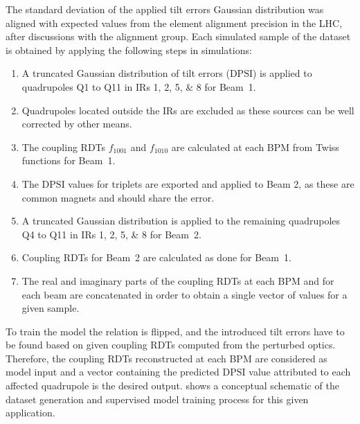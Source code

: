 The standard deviation of the applied tilt errors Gaussian distribution was aligned with expected values from the element alignment precision in the LHC, after discussions with the alignment group.
Each simulated sample of the dataset is obtained by applying the following steps in simulations:
\begin{enumerate}
    \item A truncated Gaussian distribution of tilt errors (\(\mathrm{DPSI}\)) is applied to quadrupoles Q\num{1} to Q\num{11} in IRs \numlist{1;2;5;8} for Beam~\num{1}.
    \item Quadrupoles located outside the IRs are excluded as these sources can be well corrected by other means.
    \item The coupling RDTs \(f_{1001}\) and \(f_{1010}\) are calculated at each BPM from Twiss functions for Beam~\num{1}.
    \item The \(\mathrm{DPSI}\) values for triplets are exported and applied to Beam 2, as these are common magnets and should share the error.
    \item A truncated Gaussian distribution is applied to the remaining quadrupoles Q\num{4} to Q\num{11} in IRs \numlist{1;2;5;8} for Beam~\num{2}.
    \item Coupling RDTs for Beam~\num{2} are calculated as done for Beam~\num{1}.
    \item The real and imaginary parts of the coupling RDTs at each BPM and for each beam are concatenated in order to obtain a single vector of values for a given sample.
\end{enumerate}

To train the model the relation is flipped, and the introduced tilt errors have to be found based on given coupling RDTs computed from the perturbed optics.
Therefore, the coupling RDTs reconstructed at each BPM are considered as model input and a vector containing the predicted \(\mathrm{DPSI}\) value attributed to each affected quadrupole is the desired output.
 shows a conceptual schematic of the dataset generation and supervised model training process for this given application.

